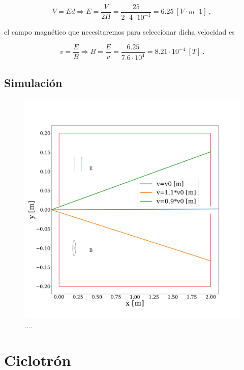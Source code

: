 \documentclass[journal]{IEEEtran}
\begin{document}
\begin{equation}
    V = Ed \Rightarrow E = \displaystyle\frac{V}{2H} = \displaystyle\frac{25}{2\cdot 4\cdot 10^{-1}} = 6.25~[V\cdot m^-1]~,
\end{equation}

el campo magnético que necesitaremos para seleccionar dicha velocidad es

\begin{equation}
    v = \displaystyle\frac{E}{B} \Rightarrow B = \displaystyle\frac{E}{v} = \displaystyle\frac{6.25}{7.6\cdot 10^4} = 8.21 \cdot 10^{-4}~[T]~.
\end{equation}

\subsection{Simulación}

\begin{figure}[!htb]
    \includegraphics[width=\linewidth]{selector_simulacion}
    \caption{....}
    \label{fig:selector_simulacion}
\end{figure}

\clearpage

\section{Ciclotrón}
\label{sec:ciclotron}
\end{document}
